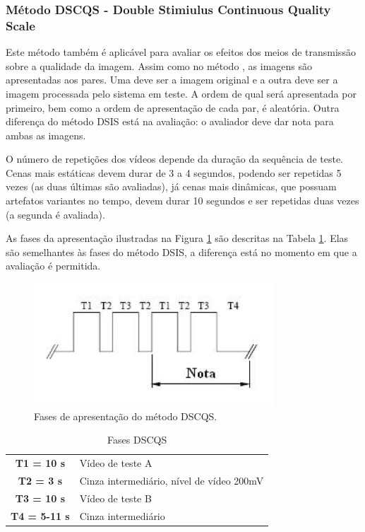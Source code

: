 \subsubsection[Método DSCQS]{Método DSCQS - Double Stimiulus Continuous Quality Scale}

Este método também é aplicável para avaliar os efeitos dos meios de transmissão sobre a qualidade da imagem. Assim como no método , as imagens são apresentadas aos pares. Uma deve ser a imagem original e a outra deve ser a imagem processada pelo sistema em teste. A ordem de qual será apresentada por primeiro, bem como a ordem de apresentação de cada par, é aleatória. Outra diferença do método DSIS está na avaliação: o avaliador deve dar nota para ambas as imagens.

O número de repetições dos vídeos depende da duração da sequência de teste. Cenas mais estáticas devem durar de 3 a 4 segundos, podendo ser repetidas 5 vezes (as duas últimas são avaliadas), já cenas mais dinâmicas, que possuam artefatos variantes no tempo, devem durar 10 segundos e ser repetidas duas vezes (a segunda é avaliada).

As fases da apresentação  ilustradas na Figura \ref{fig:dscqsfases} são descritas na Tabela \ref{tab:dscqsfases}. Elas são semelhantes às fases do método DSIS, a diferença está no momento em que a avaliação é permitida. 

\begin{figure}[!htb]
	\centering
	\includegraphics[width=0.8\textwidth]{./imgs/dscqsfases.png}
	\caption{Fases de apresentação do método DSCQS.}
	\label{fig:dscqsfases}
\end{figure}

\begin{table}[!h]
	\centering
	\caption{Fases DSCQS}
	\label{tab:dscqsfases}
	\begin{tabular}{c|l}
		\hline
		\textbf{T1 = 10 s} & Vídeo de teste A \\
		\textbf{T2 = 3 s} & Cinza intermediário, nível de vídeo 200mV \\
		\textbf{T3 = 10 s} & Vídeo de teste B \\
		\textbf{T4 = 5-11 s} & Cinza intermediário \\
		\hline
	\end{tabular}
\end{table}

